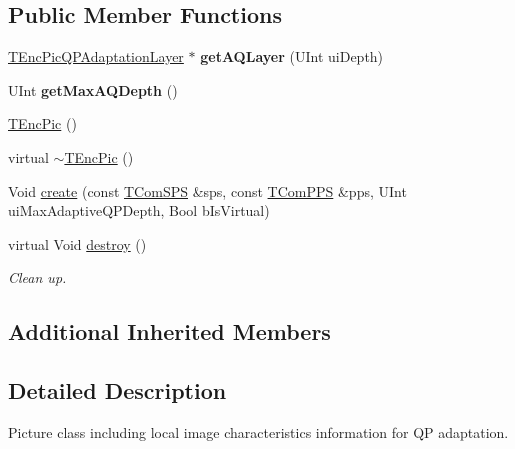 \subsection*{Public Member Functions}
\begin{DoxyCompactItemize}
\item 
\mbox{\label{class_t_enc_pic_ade18d82578d51957bf3ee4895970c8e4}} 
\hyperlink{class_t_enc_pic_q_p_adaptation_layer}{T\+Enc\+Pic\+Q\+P\+Adaptation\+Layer} $\ast$ {\bfseries get\+A\+Q\+Layer} (U\+Int ui\+Depth)
\item 
\mbox{\label{class_t_enc_pic_a56680319df957bb52a94772370c101c6}} 
U\+Int {\bfseries get\+Max\+A\+Q\+Depth} ()
\end{DoxyCompactItemize}
{\bf }\par
\begin{DoxyCompactItemize}
\item 
\hyperlink{class_t_enc_pic_a74d77b2632dc79a31a84eb9effd1aeb3}{T\+Enc\+Pic} ()
\item 
virtual \hyperlink{class_t_enc_pic_ab26fb890ac1ef6c4e9791ffcf98bdb67}{$\sim$\+T\+Enc\+Pic} ()
\item 
Void \hyperlink{class_t_enc_pic_a61fe02cef3a2756fc023b71edd83b7ef}{create} (const \hyperlink{class_t_com_s_p_s}{T\+Com\+S\+PS} \&sps, const \hyperlink{class_t_com_p_p_s}{T\+Com\+P\+PS} \&pps, U\+Int ui\+Max\+Adaptive\+Q\+P\+Depth, Bool b\+Is\+Virtual)
\item 
\mbox{\label{class_t_enc_pic_a9d684aebe615c2dcf95799bf2231bacf}} 
virtual Void \hyperlink{class_t_enc_pic_a9d684aebe615c2dcf95799bf2231bacf}{destroy} ()
\begin{DoxyCompactList}\small\item\em Clean up. \end{DoxyCompactList}\end{DoxyCompactItemize}

\subsection*{Additional Inherited Members}


\subsection{Detailed Description}
Picture class including local image characteristics information for QP adaptation. 

